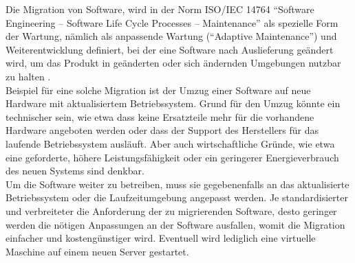 Die Migration von Software, wird in der Norm ISO/IEC 14764 "`Software
Engineering -- Software Life Cycle Processes -- Maintenance"' als spezielle
Form der Wartung, nämlich als anpassende Wartung ("`Adaptive Maintenance"') und
Weiterentwicklung definiert, bei der eine Software nach Auslieferung geändert
wird, um das Produkt in geänderten oder sich ändernden Umgebungen nutzbar zu
halten . \\
Beispiel für eine solche Migration ist der Umzug einer Software auf neue
Hardware mit aktualisiertem Betriebssystem. Grund für den Umzug könnte ein
technischer sein, wie etwa dass keine Ersatzteile mehr für die vorhandene
Hardware angeboten werden oder dass der Support des Herstellers für das laufende
Betriebssystem ausläuft. Aber auch wirtschaftliche Gründe, wie etwa eine
geforderte, höhere Leistungsfähigkeit oder ein geringerer Energieverbrauch des
neuen Systems sind denkbar. \\
Um die Software weiter zu betreiben, muss sie gegebenenfalls an das
aktualisierte Betriebssystem oder die Laufzeitumgebung angepasst werden.
Je standardisierter und verbreiteter die Anforderung der zu migrierenden
Software, desto geringer werden die nötigen Anpassungen an der
Software ausfallen, womit die Migration einfacher und kostengünstiger wird.
Eventuell wird lediglich eine virtuelle Maschine auf einem neuen Server
gestartet. 

